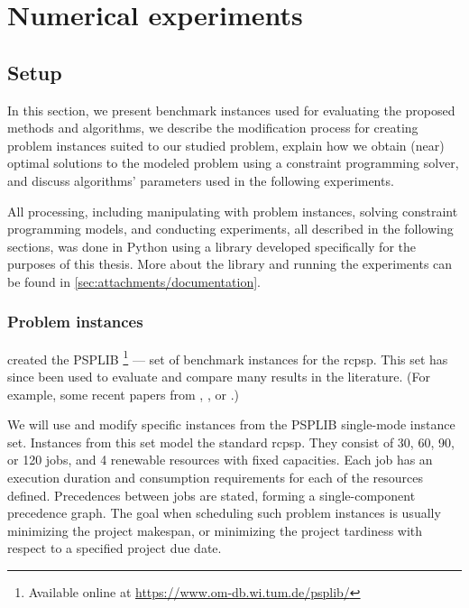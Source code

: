 \chapter{Numerical experiments} \label{chap:numerical-experiments}

\section{Setup} \label{sec:numerical-experiments/setup}

In this section, we present benchmark instances used for evaluating the proposed methods and algorithms,
we describe the modification process for creating problem instances suited to our studied problem,
explain how we obtain (near) optimal solutions to the modeled problem using a constraint programming solver,
and discuss algorithms' parameters used in the following experiments.

All processing, including manipulating with problem instances, solving constraint programming models,
and conducting experiments, all described in the following sections, was done in Python using a library
developed specifically for the purposes of this thesis.
More about the library and running the experiments can be found in \cref{sec:attachments/documentation}.

\subsection{Problem instances} \label{subsec:numerical-experiments/setup/instances}

\citet{Kolisch1997} created the PSPLIB%
\footnote{Available online at \url{https://www.om-db.wi.tum.de/psplib/}}
--- set of benchmark instances for the \ac{rcpsp}.
This set has since been used to evaluate and compare many results in the literature.
(For example, some recent papers from \citet{Bianco2011}, \citet{Cheng2015}, or \citet{Elsayed2017}.)

We will use and modify specific instances from the PSPLIB single-mode instance set.
Instances from this set model the standard \ac{rcpsp}.
They consist of 30, 60, 90, or 120 jobs,
and 4 renewable resources with fixed capacities.
Each job has an execution duration and consumption requirements for each of the resources defined.
Precedences between jobs are stated, forming a single-component precedence graph.
The goal when scheduling such problem instances is usually minimizing the project makespan,
or minimizing the project tardiness with respect to a specified project due date.

